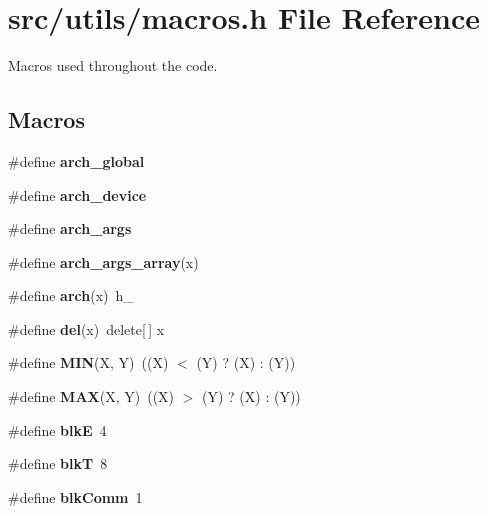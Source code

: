 \section{src/utils/macros.h File Reference}
\label{macros_8h}


Macros used throughout the code.  


\subsection*{Macros}
\begin{DoxyCompactItemize}
\item 
\#define {\bfseries arch\-\_\-global}\label{macros_8h_a84df326ef3b8cf2fee8c7522cbeb8b93}

\item 
\#define {\bfseries arch\-\_\-device}\label{macros_8h_a7a47d4615cf4b593019240b617f3677c}

\item 
\#define {\bfseries arch\-\_\-args}\label{macros_8h_ae9a5365e75e2ee4b48d38813b653be88}

\item 
\#define {\bfseries arch\-\_\-args\-\_\-array}(x)\label{macros_8h_a834614d23bdb5ff87fb6be0631821832}

\item 
\#define {\bfseries arch}(x)~h\-\_\-\label{macros_8h_a6deb48880615a034a833c0d8a5935e3f}

\item 
\#define {\bfseries del}(x)~delete[$\,$] x\label{macros_8h_a9566ab88219290378e72073713e124f1}

\item 
\#define {\bfseries M\-I\-N}(X, Y)~((X) $<$ (Y) ? (X) \-: (Y))\label{macros_8h_ad2f3678bf5eae3684fc497130b946eae}

\item 
\#define {\bfseries M\-A\-X}(X, Y)~((X) $>$ (Y) ? (X) \-: (Y))\label{macros_8h_aff9931d7524c88e07743af6535b20761}

\item 
\#define {\bfseries blk\-E}~4\label{macros_8h_abde04c70b1e716235b1ee1aece018dd5}

\item 
\#define {\bfseries blk\-T}~8\label{macros_8h_a65b7ea1ade7c5984d83c6ba7104c9886}

\item 
\#define {\bfseries blk\-Comm}~1\label{macros_8h_a83832809b9b3ee3d8aefb39d456df543}

\end{DoxyCompactItemize}



